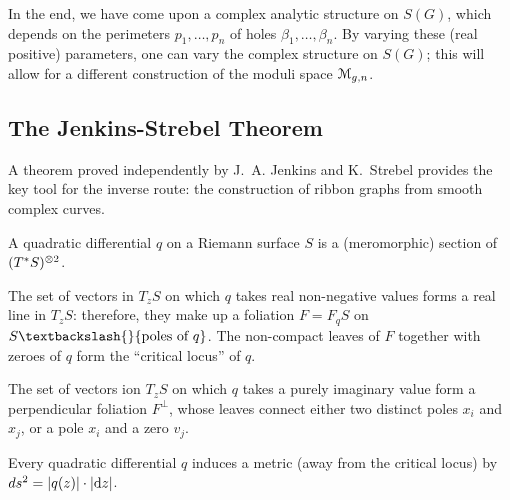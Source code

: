 In the end, we have come upon a complex analytic structure on
$S(G)$, which depends on the perimeters $p_1, \ldots, p_n$ of holes $\beta_1,
\ldots, \beta_n$. By varying these (real positive) parameters, one can vary
the complex structure on $S(G)$; this will allow for a different
construction of the moduli space $\mathcal{M}_{g,n}$.


\subsection{The Jenkins-Strebel Theorem}
\label{sec:strebel}
A theorem proved independently by J.~A. Jenkins \cite{jenkins;annals}
and K.~Strebel \cite{strebel;quadratic-differentials;1983} provides
the key tool for the inverse route: the construction of ribbon graphs
from smooth complex curves.

\begin{definition}
  A quadratic differential $q$ on a Riemann surface $S$ is a
  (meromorphic) section of $(T^*S)\sp{\otimes 2}$.
\end{definition}
The set of vectors in $T_zS$ on which $q$ takes real non-negative
values forms a real line in $T_zS$: therefore, they make up a
foliation $F = F_qS$ on $S \textbackslash{} \{\text{poles of $q$}\}$. The non-compact
leaves of $F$ together with zeroes of $q$ form the ``critical locus''
of $q$.  

The set of vectors ion $T_zS$ on which $q$ takes a purely imaginary
value form a perpendicular foliation $F^\perp$, whose leaves connect
either two distinct poles $x_i$ and $x_j$, or a pole $x_i$ and a zero
$v_j$.

Every quadratic differential $q$ induces a metric (away from the
critical locus) by $ds^2 = \lvert q(z)\rvert \cdot \lvert\mathrm{d} z\rvert$.

